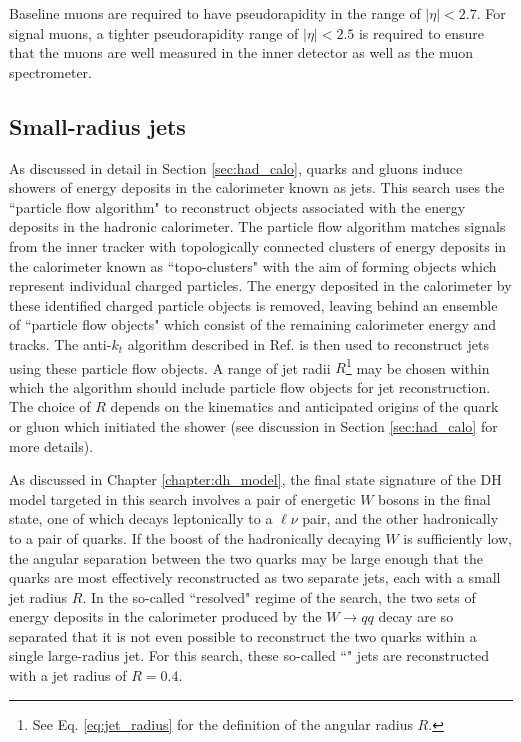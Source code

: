 Baseline muons are required to have pseudorapidity in the range of  \(|\eta| < 2.7\). For signal muons, a tighter pseudorapidity range of \(|\eta| < 2.5\) is required to ensure that the muons are well measured in the inner detector as well as the muon spectrometer. 

\subsection{Small-radius \aktfour jets}
\label{sec:atk4_jets}

As discussed in detail in Section \ref{sec:had_calo}, quarks and gluons induce showers of energy deposits in the calorimeter known as jets. This search uses the ``particle flow algorithm" \cite{PERF-2015-09} to reconstruct objects associated with the energy deposits in the hadronic calorimeter. The particle flow algorithm matches signals from the inner tracker with topologically connected clusters of energy deposits in the calorimeter known as ``topo-clusters" with the aim of forming objects which represent individual charged particles. The energy deposited in the calorimeter by these identified charged particle objects is removed, leaving behind an ensemble of ``particle flow objects" which consist of the remaining calorimeter energy and tracks. The anti-\(k_t\) algorithm described in Ref. \cite{akt_algo} is then used to reconstruct jets using these particle flow objects. A range of jet radii \(R\)\footnote{See Eq. \ref{eq:jet_radius} for the definition of the angular radius \(R\).} may be chosen within which the \akt algorithm should include particle flow objects for jet reconstruction. The choice of \(R\) depends on the kinematics and anticipated origins of the quark or gluon which initiated the shower (see discussion in Section \ref{sec:had_calo} for more details).

As discussed in Chapter \ref{chapter:dh_model}, the final state signature of the DH model targeted in this search involves a pair of energetic \(W\) bosons in the final state, one of which decays leptonically to a \(\ell\nu\) pair, and the other hadronically to a pair of quarks. If the boost of the hadronically decaying \(W\) is sufficiently low, the angular separation between the two quarks may be large enough that the quarks are most effectively reconstructed as two separate jets, each with a small jet radius \(R\). In the so-called ``resolved" regime of the search, the two sets of energy deposits in the calorimeter produced by the \(W\rightarrow qq\) decay are so separated that it is not even possible to reconstruct the two quarks within a single large-radius jet. For this search, these so-called ``\smallR" jets are reconstructed with a jet radius of \(R=0.4\).

